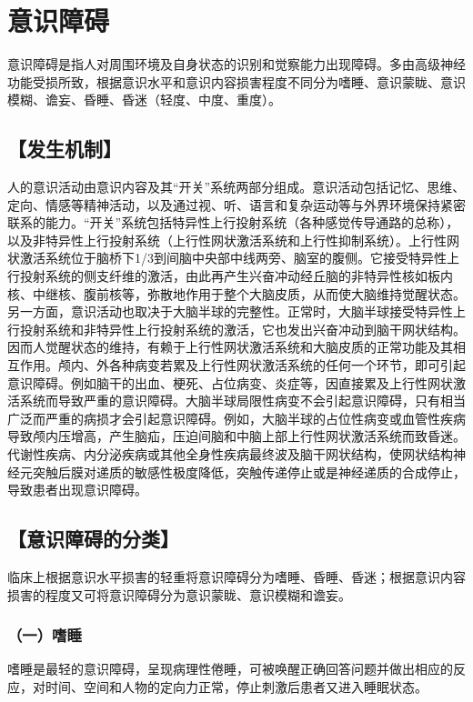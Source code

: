 \chapter{意识障碍}

意识障碍是指人对周围环境及自身状态的识别和觉察能力出现障碍。多由高级神经功能受损所致，根据意识水平和意识内容损害程度不同分为嗜睡、意识蒙眬、意识模糊、谵妄、昏睡、昏迷（轻度、中度、重度）。

\section{【发生机制】}

人的意识活动由意识内容及其“开关”系统两部分组成。意识活动包括记忆、思维、定向、情感等精神活动，以及通过视、听、语言和复杂运动等与外界环境保持紧密联系的能力。“开关”系统包括特异性上行投射系统（各种感觉传导通路的总称），以及非特异性上行投射系统（上行性网状激活系统和上行性抑制系统）。上行性网状激活系统位于脑桥下1/3到间脑中央部中线两旁、脑室的腹侧。它接受特异性上行投射系统的侧支纤维的激活，由此再产生兴奋冲动经丘脑的非特异性核如板内核、中继核、腹前核等，弥散地作用于整个大脑皮质，从而使大脑维持觉醒状态。另一方面，意识活动也取决于大脑半球的完整性。正常时，大脑半球接受特异性上行投射系统和非特异性上行投射系统的激活，它也发出兴奋冲动到脑干网状结构。因而人觉醒状态的维持，有赖于上行性网状激活系统和大脑皮质的正常功能及其相互作用。颅内、外各种病变若累及上行性网状激活系统的任何一个环节，即可引起意识障碍。例如脑干的出血、梗死、占位病变、炎症等，因直接累及上行性网状激活系统而导致严重的意识障碍。大脑半球局限性病变不会引起意识障碍，只有相当广泛而严重的病损才会引起意识障碍。例如，大脑半球的占位性病变或血管性疾病导致颅内压增高，产生脑疝，压迫间脑和中脑上部上行性网状激活系统而致昏迷。代谢性疾病、内分泌疾病或其他全身性疾病最终波及脑干网状结构，使网状结构神经元突触后膜对递质的敏感性极度降低，突触传递停止或是神经递质的合成停止，导致患者出现意识障碍。

\section{【意识障碍的分类】}

临床上根据意识水平损害的轻重将意识障碍分为嗜睡、昏睡、昏迷；根据意识内容损害的程度又可将意识障碍分为意识蒙眬、意识模糊和谵妄。

\subsection{（一）嗜睡}

嗜睡是最轻的意识障碍，呈现病理性倦睡，可被唤醒正确回答问题并做出相应的反应，对时间、空间和人物的定向力正常，停止刺激后患者又进入睡眠状态。

